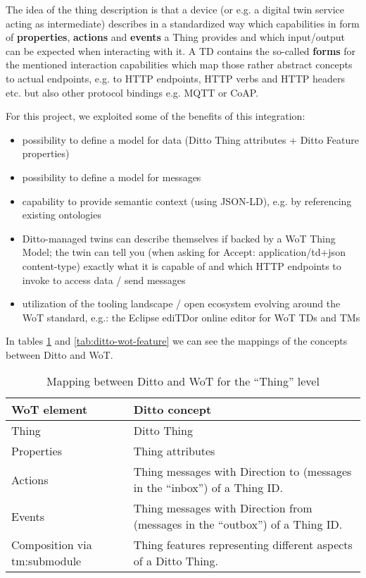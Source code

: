 The idea of the thing description is that a device (or e.g. a digital twin service acting as intermediate) describes in a standardized way which capabilities in form of \textbf{properties}, \textbf{actions} and \textbf{events} a Thing provides and which input/output can be expected when interacting with it.
A TD contains the so-called \textbf{forms} for the mentioned interaction capabilities which map those rather abstract concepts to actual endpoints, e.g. to HTTP endpoints, HTTP verbs and HTTP headers etc. but also other protocol bindings e.g. MQTT or CoAP.

For this project, we exploited some of the benefits of this integration:
\begin{itemize}
    \item possibility to define a model for data (Ditto Thing attributes + Ditto Feature properties)
    \item possibility to define a model for messages
    \item capability to provide semantic context (using JSON-LD), e.g. by referencing existing ontologies
    \item Ditto-managed twins can describe themselves if backed by a WoT Thing Model; the twin can tell you (when asking for Accept: application/td+json content-type) exactly what it is capable of and which HTTP endpoints to invoke to access data / send messages
    \item utilization of the tooling landscape / open ecosystem evolving around the WoT standard, e.g.:
    the Eclipse edi{TD}or online editor for WoT TDs and TMs
\end{itemize}

In tables \ref{tab:ditto-wot-thing} and \ref{tab:ditto-wot-feature} we can see the mappings of the concepts between Ditto and WoT.

\begin{table}[H]
    \begin{tabular}{|p{}|p{}|}
    \hline
    \textbf{WoT element} & \textbf{Ditto concept} \\ \hline
    Thing & Ditto Thing\\ \hline
    Properties & Thing attributes\\ \hline
    Actions & Thing messages with Direction to (messages in the ``inbox'') of a Thing ID.\\ \hline
    Events & 	Thing messages with Direction from (messages in the “outbox”) of a Thing ID.\\ \hline
    Composition via tm:submodule & Thing features representing different aspects of a Ditto Thing.\\ \hline
    \end{tabular}
    \caption{Mapping between Ditto and WoT for the ``Thing'' level}
    \label{tab:ditto-wot-thing}
\end{table}


